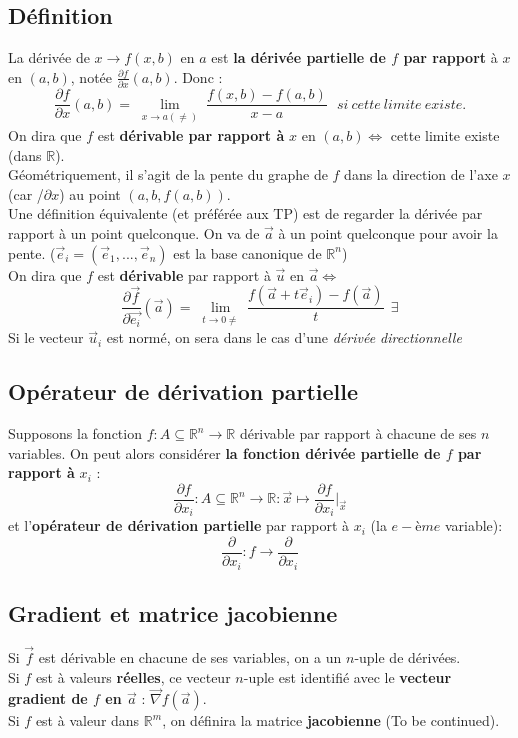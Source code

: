 \documentclass[11pt, a4paper, openany]{book}
\begin{document}
\subsection{Définition}
La dérivée de $x \rightarrow f(x, b)$ en $a$ est \textbf{la dérivée partielle de $f$ par rapport} à $x$ en $(a,b)$, notée $\frac{\partial f}{\partial x}(a,b)$. Donc :
$$\frac{\partial f}{\partial x}(a,b) = \lim\limits_{\substack{x \to a(\neq)}} \frac{f(x,b) - f(a,b)}{x-a}\ \ \ si\ cette\ limite\ existe.$$
On dira que $f$ est \textbf{dérivable par rapport à} $x$ en $(a,b) \Leftrightarrow$ cette limite existe (dans $\mathbb{R}$).\\
Géométriquement, il s'agit de la pente du graphe de $f$ dans la direction de l'axe $x$ (car /$\partial x$) au point $(a, b, f(a,b))$.\\

Une définition équivalente (et préférée aux TP) est  de regarder la dérivée par rapport à un point quelconque. On va de $\vec{a}$ à un point quelconque pour avoir la pente. ($\vec{e}_i = (\vec{e}_1, ..., \vec{e}_n)$ est la base canonique de $\mathbb{R}^n$)\\

On dira que $f$ est \textbf{dérivable} par rapport à $\vec{u}$ en $\vec{a} \Leftrightarrow$
$$\frac{\partial\vec{f}}{\partial \vec{e_i}}(\vec{a}) = \lim\limits_{\substack{t \to 0 \neq}} \frac{f(\vec{a} + t\vec{e}_i) - f(\vec{a})}{t}\ \ \exists$$
Si le vecteur $\vec{u}_i$ est normé, on sera dans le cas d'une \textit{dérivée directionnelle}\\



\subsection{Opérateur de dérivation partielle}
Supposons la fonction $f : A \subseteq \mathbb{R}^n \rightarrow \mathbb{R}$ dérivable par rapport à chacune de ses $n$ variables. On peut alors considérer \textbf{la fonction dérivée partielle de $f$ par rapport à} $x_i$ :
$$\frac{\partial f}{\partial x_i} : A \subseteq \mathbb{R}^n \rightarrow \mathbb{R} : \vec{x} \mapsto \frac{\partial f}{\partial x_i}|_{\vec{x}}$$
et l'\textbf{opérateur de dérivation partielle} par rapport à $x_i$ (la $e-{ème}$ variable):
$$\frac{\partial}{\partial x_i} : f \rightarrow \frac{\partial}{\partial x_i}$$

\subsection{Gradient et matrice jacobienne}
Si $\vec{f}$ est dérivable en chacune de ses variables, on a un $n$-uple de dérivées. \\
Si $f$ est à valeurs \textbf{réelles}, ce vecteur $n$-uple est identifié avec le \textbf{vecteur gradient de $f$ en $\vec{a}$} : $\vec{\nabla}f(\vec{a})$.\\
Si $f$ est à valeur dans $\mathbb{R}^m$, on définira la matrice \textbf{jacobienne} (To be continued).
\end{document}
